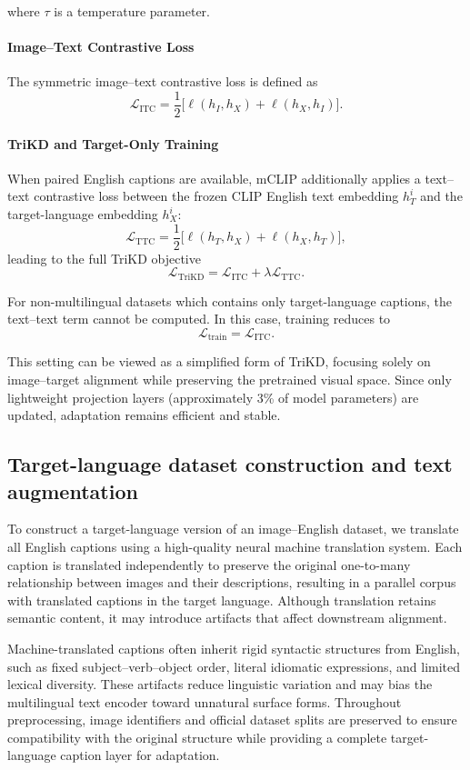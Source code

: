 where $\tau$ is a temperature parameter.

\paragraph{Image--Text Contrastive Loss}
The symmetric image–text contrastive loss is defined as
\[
\mathcal{L}_{\mathrm{ITC}}
=
\frac{1}{2}
\big[
\ell(h_I, h_X)
+
\ell(h_X, h_I)
\big].
\]

\paragraph{TriKD and Target-Only Training}
When paired English captions are available, mCLIP additionally applies a text–text contrastive loss between the frozen CLIP English text embedding $h_T^i$ and the target-language embedding $h_X^i$:
\[
\mathcal{L}_{\mathrm{TTC}}
=
\frac{1}{2}
\big[
\ell(h_T, h_X)
+
\ell(h_X, h_T)
\big],
\]
leading to the full TriKD objective
\[
\mathcal{L}_{\mathrm{TriKD}}
=
\mathcal{L}_{\mathrm{ITC}}
+
\lambda \mathcal{L}_{\mathrm{TTC}}.
\]

For non-multilingual datasets which contains only target-language captions, the text–text term cannot be computed. In this case, training reduces to
\[
\mathcal{L}_{\mathrm{train}} = \mathcal{L}_{\mathrm{ITC}}.
\]

This setting can be viewed as a simplified form of TriKD, focusing solely on image–target alignment while preserving the pretrained visual space. Since only lightweight projection layers (approximately 3\% of model parameters) are updated, adaptation remains efficient and stable.

\subsection{Target-language dataset construction and text augmentation}
To construct a target-language version of an image–English dataset, we translate all English captions using a high-quality neural machine translation system. Each caption is translated independently to preserve the original one-to-many relationship between images and their descriptions, resulting in a parallel corpus with translated captions in the target language. Although translation retains semantic content, it may introduce artifacts that affect downstream alignment.

Machine-translated captions often inherit rigid syntactic structures from English, such as fixed subject–verb–object order, literal idiomatic expressions, and limited lexical diversity. These artifacts reduce linguistic variation and may bias the multilingual text encoder toward unnatural surface forms. Throughout preprocessing, image identifiers and official dataset splits are preserved to ensure compatibility with the original structure while providing a complete target-language caption layer for adaptation.

